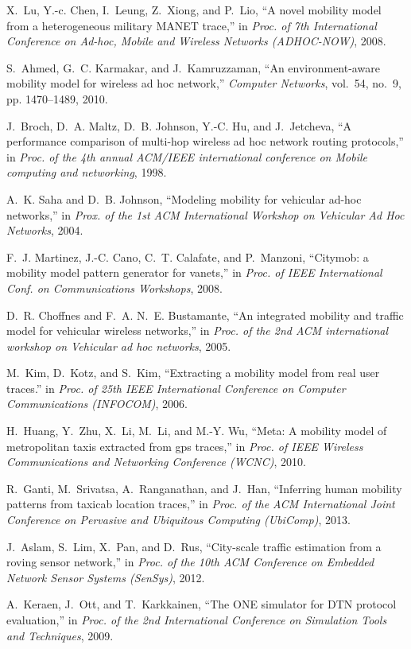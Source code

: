 \documentclass[10pt,journal,compsocconf,letterpaper]{IEEEtran}
\begin{document}
\begin{thebibliography}{10}

X.~Lu, Y.-c. Chen, I.~Leung, Z.~Xiong, and P.~Lio, ``A novel mobility model
  from a heterogeneous military MANET trace,'' in \emph{Proc. of 7th International Conference on Ad-hoc, Mobile and Wireless Networks (ADHOC-NOW)}, 2008.

S.~Ahmed, G.~C. Karmakar, and J.~Kamruzzaman, ``An environment-aware mobility
  model for wireless ad hoc network,'' \emph{Computer Networks}, vol.~54,
  no.~9, pp. 1470--1489, 2010.

J.~Broch, D.~A. Maltz, D.~B. Johnson, Y.-C. Hu, and J.~Jetcheva, ``A
  performance comparison of multi-hop wireless ad hoc network routing
  protocols,'' in \emph{Proc. of the 4th annual ACM/IEEE international
  conference on Mobile computing and networking}, 1998.

A.~K. Saha and D.~B. Johnson, ``Modeling mobility for vehicular ad-hoc
  networks,'' in \emph{Prox. of the 1st ACM International Workshop on
  Vehicular Ad Hoc Networks}, 2004.

F.~J. Martinez, J.-C. Cano, C.~T. Calafate, and P.~Manzoni, ``Citymob: a
  mobility model pattern generator for vanets,'' in \emph{Proc. of IEEE International Conf. on Communications Workshops}, 2008.

D.~R. Choffnes and F.~A. N.~E. Bustamante, ``An integrated mobility and traffic
  model for vehicular wireless networks,'' in \emph{Proc. of the 2nd ACM
  international workshop on Vehicular ad hoc networks}, 2005.

M.~Kim, D.~Kotz, and S.~Kim, ``Extracting a mobility model from real user
  traces.'' in \emph{Proc. of 25th IEEE International Conference on
  Computer Communications (INFOCOM)}, 2006.

H.~Huang, Y.~Zhu, X.~Li, M.~Li, and M.-Y. Wu, ``Meta: A mobility model of
  metropolitan taxis extracted from gps traces,'' in \emph{Proc. of IEEE Wireless
  Communications and Networking Conference (WCNC)}, 2010.

R.~Ganti, M.~Srivatsa, A.~Ranganathan, and J.~Han, ``Inferring human mobility
  patterns from taxicab location traces,'' in \emph{Proc. of the ACM
  International Joint Conference on Pervasive and Ubiquitous Computing (UbiComp)}, 2013.

J.~Aslam, S.~Lim, X.~Pan, and D.~Rus, ``City-scale traffic estimation from a
  roving sensor network,'' in \emph{Proc. of the 10th ACM Conference on
  Embedded Network Sensor Systems (SenSys)}, 2012.

A.~Keraen, J.~Ott, and T.~Karkkainen, ``The {ONE} simulator for {DTN} protocol
  evaluation,'' in \emph{Proc. of the 2nd International Conference on
  Simulation Tools and Techniques}, 2009.

\end{thebibliography}


%
\end{document}
